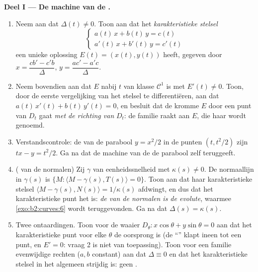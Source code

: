 \begin{problem}
\medskip
\noindent\textbf{Deel I --- De machine van de .}
\begin{enumerate}
  \item Neem aan dat $\Delta(t) \neq 0$. Toon aan dat het
        \emph{karakteristieke stelsel}
        \[
        \begin{cases} a(t)\,x + b(t)\,y = c(t)\\
        a'(t)\,x + b'(t)\,y = c'(t)\end{cases}
        \]
        een unieke oplossing $E(t) = (x(t), y(t))$ heeft, gegeven
        door $x = \dfrac{cb' - c'b}{\Delta}$, $y = \dfrac{ac' -
        a'c}{\Delta}$.
  \item Neem bovendien aan dat $E$ nabij $t$ van klasse $\mathcal
        C^1$ is met $E'(t) \neq 0$. Toon, door de eerste
        vergelijking van het stelsel te differentiëren, aan dat
        $a(t)\,x'(t) + b(t)\,y'(t) = 0$, en besluit dat de kromme
        $E$ door een punt van $D_t$ gaat \emph{met de richting
        van} $D_t$: de familie raakt aan $E$, die haar
        \emph{} wordt genoemd.
  \item Verstandscontrole: de  van de parabool $y =
        x^2/2$ in de punten $(t, t^2/2)$ zijn $tx - y = t^2/2$. Ga
        na dat de machine van de  de parabool zelf
        teruggeeft.
  \item ( van de normalen) Zij $\gamma$ van
        eenheidssnelheid met $\kappa(s) \neq 0$. De normaallijn in
        $\gamma(s)$ is $\{M : \langle M - \gamma(s), T(s) \rangle =
        0\}$. Toon aan dat haar karakteristieke stelsel $\langle M
        - \gamma(s), N(s)\rangle = 1/\kappa(s)$ afdwingt, en dus
        dat het karakteristieke punt het  is:
        \emph{de  van de normalen is de evolute}, waarmee
        \cref{exo:b2:curves:6} wordt teruggevonden. Ga na dat
        $\Delta(s) = \kappa(s)$.
  \item Twee ontaardingen. Toon voor de waaier $D_\theta : x\cos
        \theta + y\sin\theta = 0$ aan dat het karakteristieke punt
        voor elke $\theta$ de oorsprong is (de ``'' klapt
        ineen tot een punt, en $E' = 0$: vraag 2 is niet van
        toepassing). Toon voor een familie evenwijdige rechten
        ($a, b$ constant) aan dat $\Delta \equiv 0$ en dat het
        karakteristieke stelsel in het algemeen strijdig is: geen
        .
\end{enumerate}


\end{problem}
